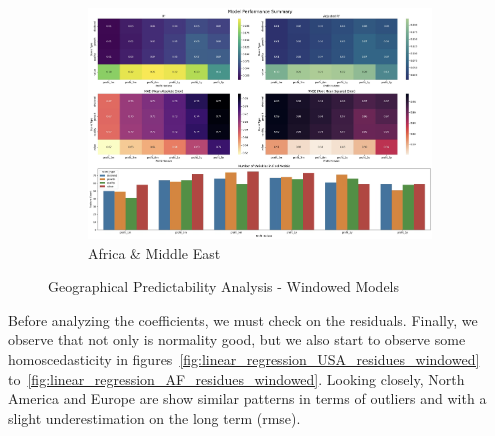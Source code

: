 \documentclass[11pt,english,a4paper,hidelinks]{book}
\begin{document}
\begin{figure}[H]
    \begin{subfigure}[b]{0.48\textwidth}
        \centering
        \includegraphics[width=\textwidth]{images/code/models/linear_regression/third_model/AF - performance.png}
        \caption{Africa \& Middle East}
    \end{subfigure}
    \caption{Geographical Predictability Analysis - Windowed Models}
    \label{fig:region_performance_windowed_models}
\end{figure}

\noindent Before analyzing the coefficients, we must check on the residuals. Finally, we observe that not only is normality good, but we also start to observe some homoscedasticity in figures~\ref{fig:linear_regression_USA_residues_windowed} to~\ref{fig:linear_regression_AF_residues_windowed}. Looking closely, North America and Europe are show similar patterns in terms of outliers and with a slight underestimation on the long term (\acrshort{rmse}).
\end{document}
